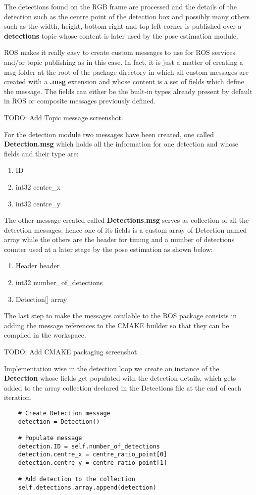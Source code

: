 The detections found on the RGB frame are processed and the details of the detection such as the centre point of the detection box and possibly many others such as the width, height, bottom-right and top-left corner is published over a \textbf{detections} topic whose content is later used by the pose estimation module.

ROS makes it really easy to create custom messages to use for ROS services and/or topic publishing as in this case. In fact, it is just a matter of creating a msg folder at the root of the package directory in which all custom messages are created with a \textbf{.msg} extension and whose content is a set of fields which define the message. The fields can either be the built-in types already present by default in ROS or composite messages previously defined.

TODO: Add Topic message screenshot.

For the detection module two messages have been created, one called \textbf{Detection.msg} which holds all the information for one detection and whose fields and their type are:

\begin{enumerate}
  \item ID
  \item int32 centre\_x
  \item int32 centre\_y
\end{enumerate}

The other message created called \textbf{Detections.msg} serves as collection of all the detection messages, hence one of its fields is a custom array of Detection named array while the others are the header for timing and a number of detections counter used at a later stage by the pose estimation as shown below:

\begin{enumerate}
  \item Header header
  \item int32 number\_of\_detections
  \item Detection[] array
\end{enumerate}

The last step to make the messages available to the ROS package consists in adding the message references to the CMAKE builder so that they can be compiled in the workspace.

TODO: Add CMAKE packaging screenshot.

Implementation wise in the detection loop we create an instance of the \textbf{Detection} whose fields get populated with the detection details, which gets added to the array collection declared in the Detections file at the end of each iteration.

\begin{lstlisting}
	# Create Detection message
	detection = Detection()
    
    # Populate message
    detection.ID = self.number_of_detections
    detection.centre_x = centre_ratio_point[0]
    detection.centre_y = centre_ratio_point[1]
    
    # Add detection to the collection
    self.detections.array.append(detection)
\end{lstlisting}